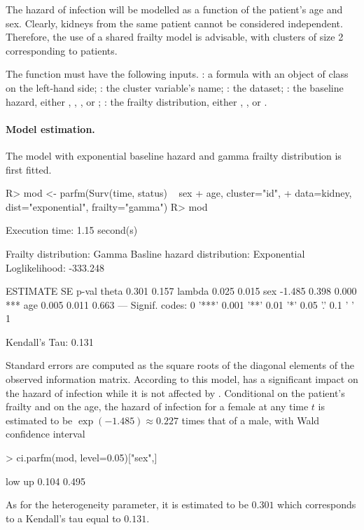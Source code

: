 The hazard of infection will be modelled as a function of the patient's age and sex.
Clearly, kidneys from the same patient cannot be considered independent.
Therefore, the use of a shared frailty model is advisable, with clusters of size 2 corresponding to patients.

The  function must have the following inputs.
    : a formula with an object of class  on the left-hand side;
    : the cluster variable's name; 
    : the dataset;
    : the baseline hazard,
      either , , ,  or ;
    : the frailty distribution,
      either , ,  or .
  
\paragraph{Model estimation.}
The model with exponential baseline hazard and gamma frailty distribution is first fitted.

\begin{CodeChunk}
\begin{CodeInput}
R> mod <- parfm(Surv(time, status) ~ sex + age, cluster="id", 
+               data=kidney, dist="exponential", frailty="gamma")
R> mod
\end{CodeInput}
\begin{CodeOutput}
Execution time: 1.15 second(s)

Frailty distribution: Gamma 
Basline hazard distribution: Exponential 
Loglikelihood: -333.248 

       ESTIMATE SE    p-val    
theta   0.301   0.157          
lambda  0.025   0.015          
sex    -1.485   0.398 0.000 ***
age     0.005   0.011 0.663    
---
Signif. codes: 0 '***' 0.001 '**' 0.01 '*' 0.05 '.' 0.1 ' ' 1

Kendall's Tau: 0.131
\end{CodeOutput}
\end{CodeChunk}

Standard errors are computed as the square roots of the diagonal elements of the observed information matrix.
According to this model,  has a significant impact on the hazard of infection 
  while it is not affected by . 
Conditional on the patient's frailty and on the age, 
  the hazard of infection for a female at any time $t$ is estimated to be 
  $\exp(-1.485) \approx 0.227$ times that of a male,
  with Wald confidence interval  
\begin{CodeChunk}
\begin{CodeInput}
> ci.parfm(mod, level=0.05)["sex",]
\end{CodeInput}
\begin{CodeOutput}
  low    up 
0.104 0.495 
\end{CodeOutput}
\end{CodeChunk}
As for the heterogeneity parameter, it is estimated to be $0.301$ which corresponds to a Kendall's tau equal to $0.131$.

